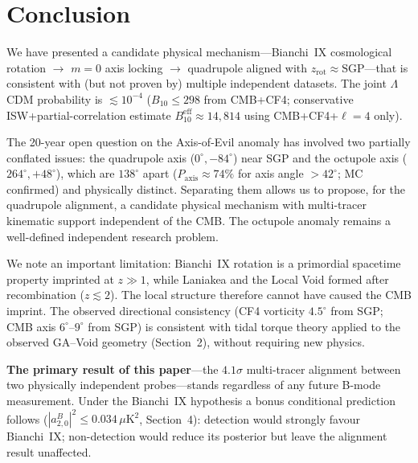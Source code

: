 \documentclass[12pt]{article}
\begin{document}
\section{Conclusion}

We have presented a candidate physical mechanism---Bianchi~IX cosmological rotation
$\to$ $m=0$ axis locking $\to$ quadrupole aligned with
$\hat{z}_\mathrm{rot}\approx\mathrm{SGP}$---that is consistent with (but not proven
by) multiple independent datasets.
The joint $\Lambda$CDM probability is $\lesssim10^{-4}$
($B_{10}\leq298$ from CMB+CF4; conservative ISW+partial-correlation estimate
$B^\mathrm{eff}_{10}\approx14{,}814$ using CMB+CF4+$\ell=4$ only).

The 20-year open question on the Axis-of-Evil anomaly has involved two partially
conflated issues: the quadrupole axis ($0^\circ, -84^\circ$) near SGP and the
octupole axis ($264^\circ, +48^\circ$), which are $138^\circ$ apart
($P_\mathrm{axis}\approx74\%$ for axis angle $>42^\circ$; MC confirmed) and
physically distinct.
Separating them allows us to propose, for the quadrupole alignment, a candidate
physical mechanism with multi-tracer kinematic support independent of the CMB.
The octupole anomaly remains a well-defined independent research problem.

We note an important limitation: Bianchi~IX rotation is a primordial spacetime
property imprinted at $z\gg1$, while Laniakea and the Local Void formed after
recombination ($z\lesssim2$). The local structure therefore cannot have caused the
CMB imprint. The observed directional consistency (CF4 vorticity $4.5^\circ$ from
SGP; CMB axis $6^\circ$--$9^\circ$ from SGP) is consistent with tidal torque
theory applied to the observed GA--Void geometry (Section~2), without
requiring new physics.

\textbf{The primary result of this paper}---the $4.1\sigma$ multi-tracer
alignment between two physically independent probes---stands regardless of
any future B-mode measurement.
Under the Bianchi~IX hypothesis a bonus conditional prediction follows
($|a^B_{2,0}|^2\leq0.034\,\mu\mathrm{K}^2$, Section~4): detection would
strongly favour Bianchi~IX; non-detection would reduce its posterior but
leave the alignment result unaffected.
\end{document}
